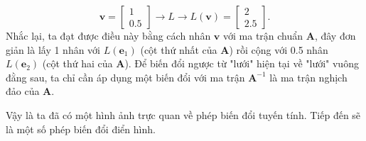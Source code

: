 \[\mathbf{v}=\begin{bmatrix}
    1\\0.5
\end{bmatrix}\rightarrow L\rightarrow L(\mathbf{v})=\begin{bmatrix}
    2\\2.5
\end{bmatrix}.\] Nhắc lại, ta đạt được  điều này bằng cách nhân \(\mathbf{v}\) với ma trận chuẩn \(\mathbf{A}\), đây đơn giản là lấy 1 nhân với \(L(\mathbf{e}_1)\) (cột thứ nhất của \(\mathbf{A}\)) rồi cộng với 0.5 nhân \(L(\mathbf{e}_2)\) (cột thứ hai của \(\mathbf{A}\)).
Để biến đổi ngược từ "lưới" hiện tại về "lưới" vuông đằng sau, ta chỉ cần áp dụng một biến đổi với ma trận \(\mathbf{A}^{-1}\) là ma trận nghịch đảo của \(\mathbf{A}\).
\vspace{8pt}

Vậy là ta đã có một hình ảnh trực quan về phép biến đổi tuyến tính. Tiếp đến sẽ là một số phép biến đổi điển hình.
\vspace{8pt}


